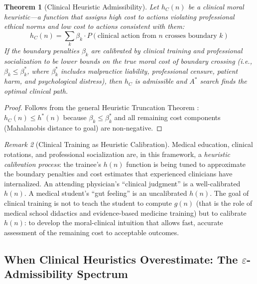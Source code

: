 \documentclass[12pt]{article}
\newtheorem{theorem}{Theorem}[section]
\theoremstyle{definition}
\theoremstyle{remark}
\newtheorem{remark}[theorem]{Remark}
\begin{document}
\begin{theorem}[Clinical Heuristic Admissibility]
\label{thm:clinical_admissibility}
Let $h_C(n)$ be a \emph{clinical moral heuristic}---a function that assigns high cost to actions violating professional ethical norms and low cost to actions consistent with them:
\begin{equation}
h_C(n) = \sum_{k} \beta_k \cdot P(\text{clinical action from } n \text{ crosses boundary } k)
\end{equation}
If the boundary penalties $\beta_k$ are calibrated by clinical training and professional socialization to be lower bounds on the true moral cost of boundary crossing (i.e., $\beta_k \leq \beta_k^*$, where $\beta_k^*$ includes malpractice liability, professional censure, patient harm, and psychological distress), then $h_C$ is admissible and $A^*$ search finds the optimal clinical path.
\end{theorem}

\begin{proof}
Follows from the general Heuristic Truncation Theorem \cite{bond2026geometric}: $h_C(n) \leq h^*(n)$ because $\beta_k \leq \beta_k^*$ and all remaining cost components (Mahalanobis distance to goal) are non-negative.
\end{proof}

\begin{remark}[Clinical Training as Heuristic Calibration]
Medical education, clinical rotations, and professional socialization are, in this framework, a \emph{heuristic calibration process}: the trainee's $h(n)$ function is being tuned to approximate the boundary penalties and cost estimates that experienced clinicians have internalized.  An attending physician's ``clinical judgment'' is a well-calibrated $h(n)$.  A medical student's ``gut feeling'' is an uncalibrated $h(n)$.  The goal of clinical training is not to teach the student to compute $g(n)$ (that is the role of medical school didactics and evidence-based medicine training) but to calibrate $h(n)$: to develop the moral-clinical intuition that allows fast, accurate assessment of the remaining cost to acceptable outcomes.
\end{remark}

\subsection{When Clinical Heuristics Overestimate: The $\varepsilon$-Admissibility Spectrum}
\label{sec:epsilon_admissibility}
\end{document}
